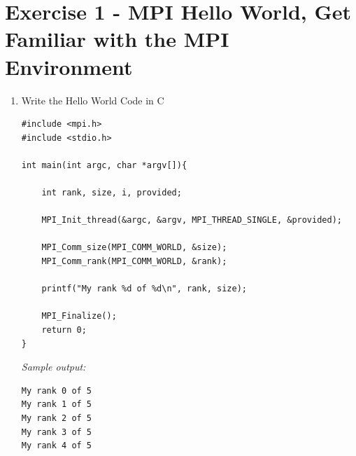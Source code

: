 \documentclass[12pt]{article}
\begin{document}
\section{Exercise 1 - MPI Hello World, Get Familiar with the MPI Environment}
\begin{enumerate}
    \item Write the Hello World Code in C\\
    \begin{lstlisting}[style=CStyle]
#include <mpi.h>
#include <stdio.h>

int main(int argc, char *argv[]){

	int rank, size, i, provided;

	MPI_Init_thread(&argc, &argv, MPI_THREAD_SINGLE, &provided);

	MPI_Comm_size(MPI_COMM_WORLD, &size);
	MPI_Comm_rank(MPI_COMM_WORLD, &rank);

	printf("My rank %d of %d\n", rank, size);

	MPI_Finalize();
	return 0;
}
	\end{lstlisting}
	
\textit{Sample output:}
\begin{lstlisting}
My rank 0 of 5
My rank 1 of 5
My rank 2 of 5
My rank 3 of 5
My rank 4 of 5
\end{lstlisting}
	

\end{enumerate}
\end{document}
